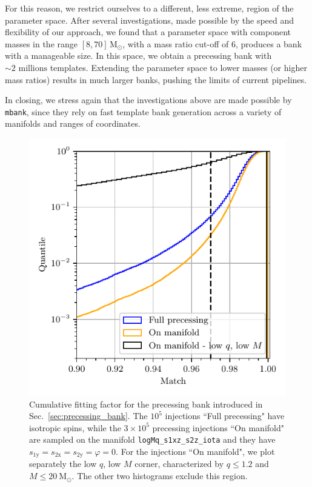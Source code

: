 \documentclass[twocolumn,showpacs,preprintnumbers,nofootinbib,prd,
superscriptaddress,10pt]{revtex4-2}
\begin{document}
For this reason, we restrict ourselves to a different, less extreme, region of the parameter space. After several investigations, made possible by the speed and flexibility of our approach, we found that a parameter space with component masses in the range $[8, 70]\,\mathrm{M_\odot}$, with a mass ratio cut-off of $6$, produces a bank with a manageable size.
In this space, we obtain a precessing bank with $\sim 2 \text{ millions}$ templates. Extending the parameter space to lower masses (or higher mass ratios) results in much larger banks, pushing the limits of current pipelines.

In closing, we stress again that the investigations above are made possible by \texttt{mbank}, since they rely on fast template bank generation across a variety of manifolds and ranges of coordinates.


\begin{figure}[t]
	\centering
	\includegraphics[scale = 1.]{precessing_hist}
	\caption{Cumulative fitting factor for the precessing bank introduced in Sec.~\ref{sec:precessing_bank}. The $10^5$ injections ``Full precessing" have isotropic spins, while the $3\times 10^5$ precessing injections ``On manifold" are sampled on the manifold \texttt{logMq\_s1xz\_s2z\_iota} and they have $s_\text{1y} = s_\text{2x} = s_\text{2y} = \varphi = 0$.
	For the injections ``On manifold", we plot separately the low $q$, low $M$ corner, characterized by $q \leq 1.2$ and $M \leq \SI{20}{\mathrm{M_\odot}}$. The other two histograms exclude this region. }
	\label{fig:precessing_hist}
\end{figure}
\end{document}
